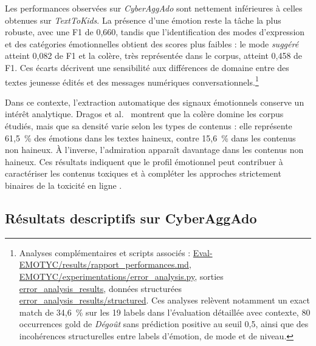 \FloatBarrier

Les performances observées sur \textit{CyberAggAdo} sont nettement inférieures à celles obtenues sur \textit{TextToKids}. La présence d'une émotion reste la tâche la plus robuste, avec une F1 de 0,660, tandis que l'identification des modes d'expression et des catégories émotionnelles obtient des scores plus faibles : le mode \textit{suggéré} atteint 0,082 de F1 et la colère, très représentée dans le corpus, atteint 0,458 de F1. Ces écarts décrivent une sensibilité aux différences de domaine entre des textes jeunesse édités et des messages numériques conversationnels.\footnote{Analyses complémentaires et scripts associés : \href{https://github.com/GwenTsang/Eval-EMOTYC/blob/main/results/rapport_performances.md}{Eval-EMOTYC/results/rapport\_performances.md}, \href{https://github.com/GwenTsang/EMOTYC/blob/master/experimentations/error_analysis.py}{EMOTYC/experimentations/error\_analysis.py}, sorties \href{https://github.com/GwenTsang/EMOTYC/tree/master/experimentations/error_analysis_results}{error\_analysis\_results}, données structurées \href{https://github.com/GwenTsang/EMOTYC/tree/master/experimentations/error_analysis_results/structured}{error\_analysis\_results/structured}. Ces analyses relèvent notamment un exact match de 34,6~\% sur les 19 labels dans l'évaluation détaillée avec contexte, 80 occurrences gold de \textit{Dégoût} sans prédiction positive au seuil 0,5, ainsi que des incohérences structurelles entre labels d'émotion, de mode et de niveau.}

Dans ce contexte, l'extraction automatique des signaux émotionnels conserve un intérêt analytique. Dragos et al.~\citep{dragos2024exploring} montrent que la colère domine les corpus étudiés, mais que sa densité varie selon les types de contenus : elle représente 61,5~\% des émotions dans les textes haineux, contre 15,6~\% dans les contenus non haineux. À l'inverse, l'admiration apparaît davantage dans les contenus non haineux. Ces résultats indiquent que le profil émotionnel peut contribuer à caractériser les contenus toxiques et à compléter les approches strictement binaires de la toxicité en ligne \citep{dragos2024exploring,battistelli2025introduction}.

\subsection{Résultats descriptifs sur CyberAggAdo}

